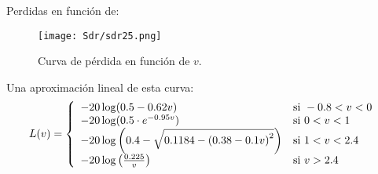 \documentclass[
	12pt, %
	fleqn, %
	a4paper, %
	oneside, %
]{LegrandOrangeBook}
\begin{document}
Perdidas en función de:
\begin{figure}[H]
\centering
\texttt{[image: Sdr/sdr25.png]}
\caption{Curva de pérdida en función de $v$.}
\end{figure}
Una aproximación lineal de esta curva:
\begin{equation}
L(v) = \left\lbrace
\begin{array}{ll}
-20\log(0.5-0.62v) & \textup{si } -0.8<v<0\\
-20\log(0.5\cdot e^{-0.95v}) & \textup{si } 0<v<1\\
-20\log\left(0.4-\sqrt{0.1184-\left(0.38-0.1v\right)^2}\right) & \textup{si } 1<v<2.4\\
-20\log\left(\frac{0.225}{v}\right) & \textup{si } v>2.4\
\end{array}
\right.
\end{equation}
\end{document}
